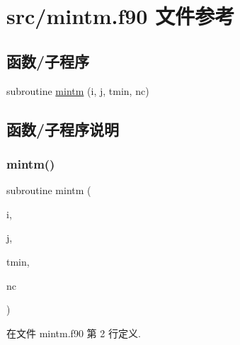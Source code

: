 \hypertarget{mintm_8f90}{}\section{src/mintm.f90 文件参考}
\label{mintm_8f90}
\subsection*{函数/子程序}
\begin{DoxyCompactItemize}
\item 
subroutine \mbox{\hyperlink{mintm_8f90_ad992029fdfa78ca208231e1c9e2aa0a1}{mintm}} (i, j, tmin, nc)
\end{DoxyCompactItemize}


\subsection{函数/子程序说明}
\mbox{\label{mintm_8f90_ad992029fdfa78ca208231e1c9e2aa0a1}} 
\subsubsection{\texorpdfstring{mintm()}{mintm()}}
{\footnotesize\ttfamily subroutine mintm (\begin{DoxyParamCaption}\item[{}]{i,  }\item[{}]{j,  }\item[{}]{tmin,  }\item[{}]{nc }\end{DoxyParamCaption})}



在文件 mintm.\+f90 第 2 行定义.

